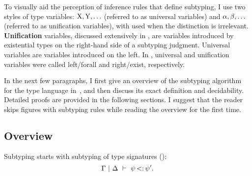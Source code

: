 

To visually aid the perception of inference rules that define subtyping,
I use two styles of type variables: $\mathrm{X}, \mathrm{Y}, \ldots$ (referred to as
universal variables) and $\alpha, \beta, \ldots$ (referred to as unification
variables), with \vany used when the distinction is irrelevant.
\textbf{Unification} variables, discussed extensively
in , are variables introduced by existential
types on the right-hand side of a subtyping judgment.
Universal variables are variables introduced on the left.
In , universal and unification variables
were called left/forall and right/exist, respectively.

In the next few paragraphs, I first give an overview of the subtyping
algorithm for the type language in~,
and then discuss its exact definition and decidability.
Detailed proofs are provided in the following sections.
I suggest that the reader skips figures with subtyping rules
while reading the overview for the first time.


\subsection{Overview}

Subtyping starts with subtyping of type signatures
():
\[ \Gamma~\vert~\Delta\ \vdash\ \psi \operatorname{<:} \psi'. \]

